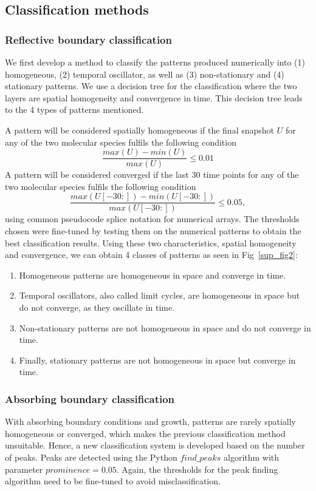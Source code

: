 \documentclass[10pt,letterpaper]{article}
\begin{document}
\subsection*{Classification methods}\label{classification}

\subsubsection*{Reflective boundary classification}\label{numerical_classification1}
We first develop a method to classify the patterns produced numerically into (1) homogeneous, (2) temporal oscillator, as well as (3) non-stationary and (4) stationary patterns.
We use a decision tree for the classification where the two layers are spatial homogeneity and convergence in time.
This decision tree leads to the 4 types of patterns mentioned.

A pattern will be considered spatially homogeneous if the final snapshot $U$ for any of the two molecular species fulfils the following condition
\begin{equation}
    \frac{max(U) - min(U)}{max(U)} \leq 0.01
\end{equation}
A pattern will be considered converged if the last 30 time points for any of the two molecular species fulfils the following condition
\begin{equation}
    \frac{max(U[-30:]) - min(U[-30:])}{max(U[-30:])} \leq 0.05,
\end{equation}
using common pseudocode splice notation for numerical arrays. The thresholds chosen were fine-tuned by testing them on the numerical patterns to obtain the best classification results.
Using these two characteristics, spatial homogeneity and convergence, we can obtain 4 classes of patterns as seen in Fig~\ref{sup_fig2}:
\begin{enumerate}
    \item Homogeneous patterns are homogeneous in space and converge in time.
    \item Temporal oscillators, also called limit cycles, are homogeneous in space but do not converge, as they oscillate in time.
    \item Non-stationary patterns are not homogeneous in space and do not converge in time.
    \item Finally, stationary patterns are not homogeneous in space but converge in time.
\end{enumerate}
\subsubsection*{Absorbing boundary classification}\label{numerical_classification2}
With absorbing boundary conditions and growth, patterns are rarely spatially homogeneous or converged, which makes the previous classification method unsuitable. Hence, a new classification system is developed based on the number of peaks.
Peaks are detected using the Python $find\_peaks$ algorithm with parameter $prominence=0.05$.
Again, the thresholds for the peak finding algorithm need to be fine-tuned to avoid misclassification.
\end{document}
